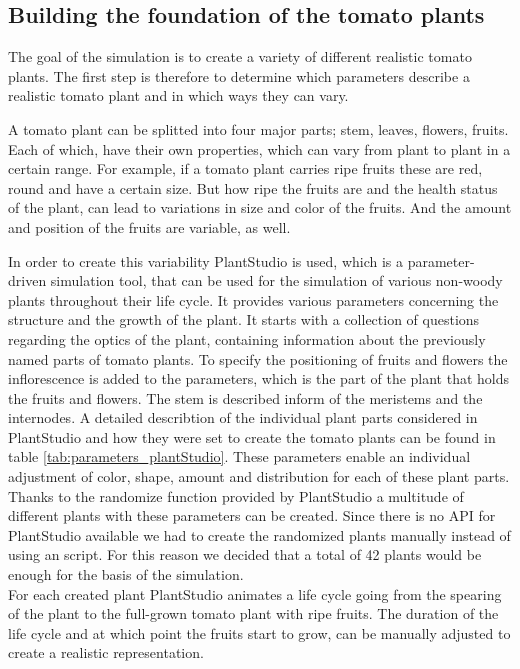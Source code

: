 \graphicspath{{members/cm/figures/}}

\subsection{Building the foundation of the tomato plants}


The goal of the simulation is to create a variety of different realistic tomato plants. The first step is therefore to determine which parameters describe a realistic tomato plant and in which ways they can vary.

A tomato plant can be splitted into four major parts; stem, leaves, flowers, fruits. Each of which, have their own properties, which can vary from plant to plant in a certain range. For example, if a tomato plant carries ripe fruits these are red, round and have a certain size. But how ripe the fruits are and the health status of the plant, can lead to variations in size and color of the fruits. And the amount and position of the fruits are variable, as well. 

In order to create this variability PlantStudio is used, which is a parameter-driven simulation tool, that can be used for the simulation of various non-woody plants throughout their life cycle. It provides various parameters concerning the structure and the growth of the plant. It starts with a collection of questions regarding the optics of the plant, containing information about the previously named parts of tomato plants. To specify the positioning of fruits and flowers the inflorescence is added to the parameters, which is the part of the plant that holds the fruits and flowers. The stem is described inform of the meristems and the internodes. A detailed describtion of the individual plant parts considered in PlantStudio and how they were set to create the tomato plants can be found in table \ref{tab:parameters_plantStudio}. These parameters enable an individual adjustment of color, shape, amount and distribution for each of these plant parts. Thanks to the randomize function provided by PlantStudio a multitude of different plants with these parameters can be created. Since there is no API for PlantStudio available we had to create the randomized plants manually instead of using an script. For this reason we decided that a total of 42 plants would be enough for the basis of the simulation. \\

For each created plant PlantStudio animates a life cycle going from the spearing of the plant to the full-grown tomato plant with ripe fruits. The duration of the life cycle and at which point the fruits start to grow, can be manually adjusted to create a realistic representation. \\

